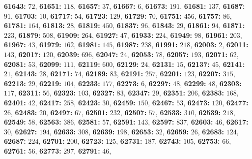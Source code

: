 \textsf{\bfseries 61643:} $72$, \textsf{\bfseries 61651:} $118$, \textsf{\bfseries 61657:} $37$, \textsf{\bfseries 61667:} $6$, \textsf{\bfseries 61673:} $191$, \textsf{\bfseries 61681:} $137$, \textsf{\bfseries 61687:} $91$, \textsf{\bfseries 61703:} $10$, \textsf{\bfseries 61717:} $54$, \textsf{\bfseries 61723:} $129$, \textsf{\bfseries 61729:} $70$, \textsf{\bfseries 61751:} $456$, \textsf{\bfseries 61757:} $86$, \textsf{\bfseries 61781:} $164$, \textsf{\bfseries 61813:} $28$, \textsf{\bfseries 61819:} $450$, \textsf{\bfseries 61837:} $96$, \textsf{\bfseries 61843:} $29$, \textsf{\bfseries 61861:} $94$, \textsf{\bfseries 61871:} $223$, \textsf{\bfseries 61879:} $508$, \textsf{\bfseries 61909:} $264$, \textsf{\bfseries 61927:} $47$, \textsf{\bfseries 61933:} $224$, \textsf{\bfseries 61949:} $98$, \textsf{\bfseries 61961:} $203$, \textsf{\bfseries 61967:} $43$, \textsf{\bfseries 61979:} $162$, \textsf{\bfseries 61981:} $145$, \textsf{\bfseries 61987:} $238$, \textsf{\bfseries 61991:} $218$, \textsf{\bfseries 62003:} $2$, \textsf{\bfseries 62011:} $143$, \textsf{\bfseries 62017:} $120$, \textsf{\bfseries 62039:} $696$, \textsf{\bfseries 62047:} $24$, \textsf{\bfseries 62053:} $78$, \textsf{\bfseries 62057:} $193$, \textsf{\bfseries 62071:} $62$, \textsf{\bfseries 62081:} $53$, \textsf{\bfseries 62099:} $111$, \textsf{\bfseries 62119:} $600$, \textsf{\bfseries 62129:} $24$, \textsf{\bfseries 62131:} $15$, \textsf{\bfseries 62137:} $45$, \textsf{\bfseries 62141:} $21$, \textsf{\bfseries 62143:} $28$, \textsf{\bfseries 62171:} $74$, \textsf{\bfseries 62189:} $83$, \textsf{\bfseries 62191:} $257$, \textsf{\bfseries 62201:} $123$, \textsf{\bfseries 62207:} $315$, \textsf{\bfseries 62213:} $29$, \textsf{\bfseries 62219:} $104$, \textsf{\bfseries 62233:} $177$, \textsf{\bfseries 62273:} $6$, \textsf{\bfseries 62297:} $48$, \textsf{\bfseries 62299:} $48$, \textsf{\bfseries 62303:} $117$, \textsf{\bfseries 62311:} $56$, \textsf{\bfseries 62323:} $103$, \textsf{\bfseries 62327:} $83$, \textsf{\bfseries 62347:} $29$, \textsf{\bfseries 62351:} $206$, \textsf{\bfseries 62383:} $168$, \textsf{\bfseries 62401:} $42$, \textsf{\bfseries 62417:} $258$, \textsf{\bfseries 62423:} $30$, \textsf{\bfseries 62459:} $150$, \textsf{\bfseries 62467:} $53$, \textsf{\bfseries 62473:} $120$, \textsf{\bfseries 62477:} $26$, \textsf{\bfseries 62483:} $20$, \textsf{\bfseries 62497:} $67$, \textsf{\bfseries 62501:} $232$, \textsf{\bfseries 62507:} $57$, \textsf{\bfseries 62533:} $310$, \textsf{\bfseries 62539:} $218$, \textsf{\bfseries 62549:} $58$, \textsf{\bfseries 62563:} $386$, \textsf{\bfseries 62581:} $57$, \textsf{\bfseries 62591:} $143$, \textsf{\bfseries 62597:} $837$, \textsf{\bfseries 62603:} $46$, \textsf{\bfseries 62617:} $30$, \textsf{\bfseries 62627:} $194$, \textsf{\bfseries 62633:} $308$, \textsf{\bfseries 62639:} $198$, \textsf{\bfseries 62653:} $32$, \textsf{\bfseries 62659:} $26$, \textsf{\bfseries 62683:} $124$, \textsf{\bfseries 62687:} $224$, \textsf{\bfseries 62701:} $200$, \textsf{\bfseries 62723:} $125$, \textsf{\bfseries 62731:} $187$, \textsf{\bfseries 62743:} $105$, \textsf{\bfseries 62753:} $66$, \textsf{\bfseries 62761:} $56$, \textsf{\bfseries 62773:} $297$, \textsf{\bfseries 62791:} $46$, 
